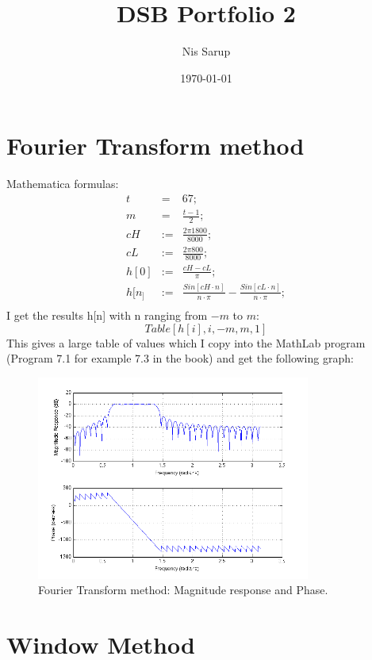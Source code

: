 \documentclass[a4wide,10pt]{article}
\begin{document}
\title{DSB Portfolio 2}
\author{Nis Sarup}
\date{\today}
\maketitle

\newpage

	\section{Fourier Transform method} %
	\label{sec:fourier_transform_method}
		Mathematica formulas:
		\begin{eqnarray}
			t &=& 67; \nonumber \\
			m &=& \frac{t-1}{2}; \nonumber \\
			cH &:=& \frac{2\pi 1800}{8000}; \nonumber \\
			cL &:=& \frac{2\pi 800}{8000}; \nonumber \\
			h[0] &:=& \frac{cH-cL}{\pi}; \nonumber \\
			h[n_] &:=& \frac{Sin[cH \cdot n]}{n\cdot \pi} - \frac{Sin[cL \cdot n]}{n\cdot \pi}; \nonumber \\
		\end{eqnarray}
		I get the results h[n] with n ranging from $-m$ to $m$:
		\begin{equation}
			Table[h[i], {i, -m, m, 1}]
		\end{equation}
		This gives a large table of values which I copy into the MathLab program (Program 7.1 for example 7.3 in the book) and get the following graph:
		\begin{figure}[htbp]
			\centering
				\includegraphics[width=9cm]{images/opgave_1.png}
			\caption{Fourier Transform method: Magnitude response and Phase.}
			\label{fig:images_opgave_1}
		\end{figure}
	
	\newpage
	
	\section{Window Method} %
	\label{sec:window_method}
		
	
\end{document}
